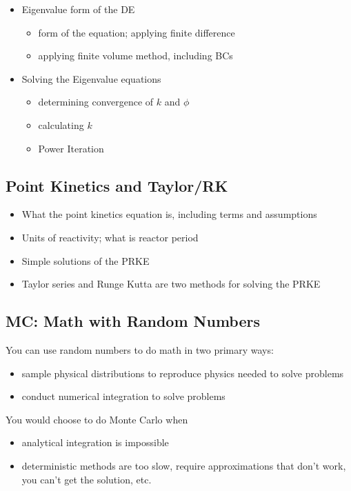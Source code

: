 \documentclass[12pt]{article}
\begin{document}
\begin{itemize}
\item Eigenvalue form of the DE
  \begin{itemize}
  \item form of the equation; applying finite difference
  \item applying finite volume method, including BCs
  \end{itemize}
  
\item Solving the Eigenvalue equations
  \begin{itemize}
  \item determining convergence of $k$ and $\phi$
  \item calculating $k$
  \item Power Iteration
  \end{itemize}
\end{itemize}

\subsection*{Point Kinetics and Taylor/RK}
\begin{itemize}
\item What the point kinetics equation is, including terms and assumptions
\item Units of reactivity; what is reactor period 
\item Simple solutions of the PRKE
\item Taylor series and Runge Kutta are two methods for solving the PRKE
\end{itemize}


\subsection*{MC: Math with Random Numbers}
You can use random numbers to do math in two primary ways: 
\begin{itemize}
\item sample physical distributions to reproduce physics needed to solve  problems
\item conduct numerical integration to solve problems
\end{itemize}

You would choose to do Monte Carlo when 
\begin{itemize}
\item analytical integration is impossible
\item deterministic methods are too slow, require approximations that don't work, you can't get the solution, etc.
\end{itemize} 
\end{document}
